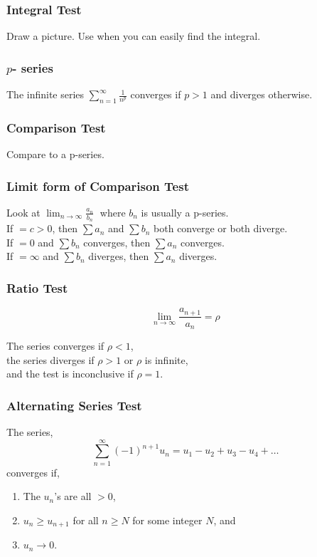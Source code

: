 \documentclass[a4paper,10pt]{article}
\begin{document}
\subsubsection*{Integral Test}
Draw a picture. Use when you can easily find the integral.

\subsubsection*{$p$- series}
The infinite series $\displaystyle \sum_{n=1}^{\infty} \frac{1}{n^p}$ converges if $p>1$ and diverges otherwise.

\subsubsection*{Comparison Test}
Compare to a p-series.

\subsubsection*{Limit form of Comparison Test}
Look at $\displaystyle \lim_{n \to \infty}{\frac{a_n}{b_n}}\;$ where $b_n$ is usually a p-series.\\
If $=c>0$, then $\sum a_n$ and $\sum b_n$ both converge or both diverge.\\
If $=0$ and $\sum b_n$ converges, then $\sum a_n$ converges.\\
If $=\infty$ and $\sum b_n$ diverges, then $\sum a_n$ diverges.

\subsubsection*{Ratio Test}
$$\lim_{n \to \infty} \frac{a_{n+1}}{a_n} = \rho$$

The series converges if $\rho < 1$,\\
the series diverges if $\rho > 1$ or $\rho$ is infinite,\\
and the test is inconclusive if $\rho = 1$.

\subsubsection*{Alternating Series Test}
The series,
$$\sum_{n=1}^{\infty} (-1)^{n+1} u_n = u_1 - u_2 + u_3 - u_4 + \dots$$
converges if,
\begin{enumerate}
 \item The $u_n$'s are all $>0$,
\item $u_n \ge u_{n+1}$ for all $n \ge N$ for some integer $N$, and
\item $u_n \rightarrow 0$.
\end{enumerate}
\end{document}
